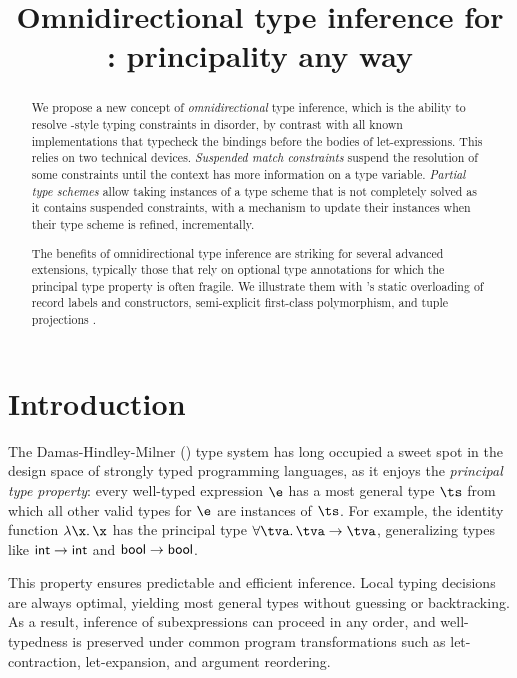 \documentclass[acmsmall,screen,nonacm,review]{acmart}
\title{Omnidirectional type inference for \ML: principality any way}
\begin{document}
\begin{abstract}
We propose a new concept of \emph{omnidirectional} type inference, which is
the ability to resolve \ML-style typing constraints in disorder, by
contrast with all known implementations that typecheck the
bindings before the bodies of let-expressions.
%
This relies on two technical devices. \emph{Suspended match constraints} suspend the resolution of some constraints until the context has more information on a type variable. \emph{Partial type schemes} allow taking instances of a type scheme that is not completely solved as it contains suspended constraints, with a mechanism to update their instances when their type scheme is refined, incrementally.

The benefits of omnidirectional type inference are striking for several
advanced \ML extensions, typically those that rely on optional type
annotations for which the principal type property is often fragile. We
illustrate them with \OCaml's static overloading of record labels and
constructors, semi-explicit first-class polymorphism, and tuple projections
\ala \SML.
\end{abstract}
\maketitle

\section{Introduction}
\label{sec/introduction}


The Damas-Hindley-Milner (\HM) \cite{Damas-Milner/W@popl82} type system has
long occupied a sweet spot in the design space of strongly typed programming
languages, as it enjoys the \emph{principal type property}: every well-typed
expression $\e$ has a most general type $\ts$ from which all other valid
types for $\e$ are instances of $\ts$. For example, the identity function
$\efun \x \x$ has the principal type $\tfor \tv \tv \to \tv$, generalizing
types like $\mathsf{int} \to \mathsf{int}$ and $\mathsf{bool} \to \mathsf{bool}$.


This property ensures predictable and efficient inference. Local typing
decisions are always optimal, yielding most general types without guessing or
backtracking. As a result, inference of subexpressions can proceed in any
order, and well-typedness is preserved under common program transformations
such as let-contraction, let-expansion, and argument reordering.
\end{document}
